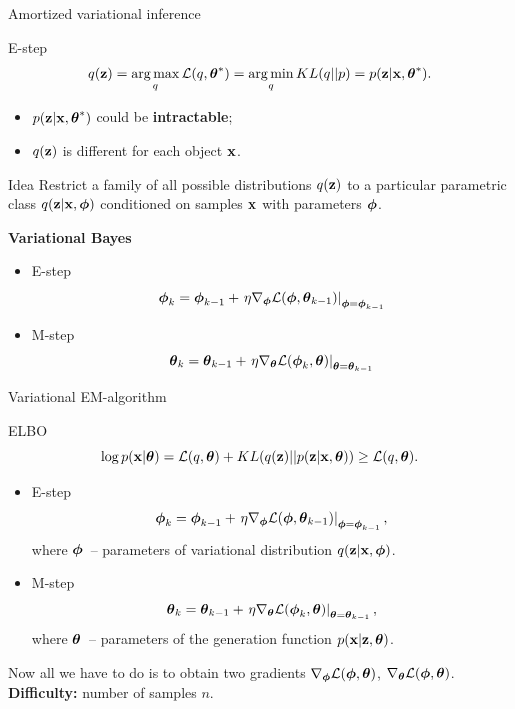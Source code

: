 \begin{frame}{Amortized variational inference}
    \begin{block}{E-step}
    \vspace{-0.3cm}
    \[
		q(\mathbf{z}) = \operatorname*{arg\,max}_q \mathcal{L} (q, \boldsymbol{\theta}^*) = \operatorname*{arg\,min}_q KL(q || p) =
		 p(\mathbf{z}| \mathbf{x}, \boldsymbol{\theta}^*).
	\]
	\begin{itemize}
		\item $p(\mathbf{z}| \mathbf{x}, \boldsymbol{\theta}^*)$ could be \textbf{intractable};
		\item $q(\mathbf{z})$ is different for each object $\mathbf{x}$.
	\end{itemize}
    \end{block}
	\begin{block}{Idea}
	Restrict a family of all possible distributions $q(\mathbf{z})$ to a particular parametric class $q(\mathbf{z}|\mathbf{x}, \boldsymbol{\phi})$ conditioned on samples $\mathbf{x}$ with parameters $\boldsymbol{\phi}$.
	\end{block}
	
	\textbf{Variational Bayes}
	\begin{itemize}
		\item E-step
		\[
		\boldsymbol{\phi}_k = \boldsymbol{\phi}_{k-1} + \left.\eta \nabla_{\boldsymbol{\phi}} \mathcal{L}(\boldsymbol{\phi}, \boldsymbol{\theta}_{k-1})\right|_{\boldsymbol{\phi}=\boldsymbol{\phi}_{k-1}}
		\]
		\item M-step
		\[
		\boldsymbol{\theta}_k = \boldsymbol{\theta}_{k-1} + \left.\eta \nabla_{\boldsymbol{\theta}} \mathcal{L}(\boldsymbol{\phi}_k, \boldsymbol{\theta})\right|_{\boldsymbol{\theta}=\boldsymbol{\theta}_{k-1}}
		\]
	\end{itemize}
\end{frame}
\begin{frame}{Variational EM-algorithm}

	\begin{block}{ELBO}
		\vspace{-0.1cm}
		\[
		\log p(\mathbf{x}| \boldsymbol{\theta}) = \mathcal{L} (q, \boldsymbol{\theta}) + KL(q(\mathbf{z}) || p(\mathbf{z}|\mathbf{x}, \boldsymbol{\theta})) \geq \mathcal{L} (q, \boldsymbol{\theta}).
		\]
	\end{block}
	\begin{itemize}
		\item E-step
		\[
		\boldsymbol{\phi}_k = \boldsymbol{\phi}_{k-1} + \left.\eta \nabla_{\boldsymbol{\phi}} \mathcal{L}(\boldsymbol{\phi}, \boldsymbol{\theta}_{k-1})\right|_{\boldsymbol{\phi}=\boldsymbol{\phi}_{k-1}},
		\]
		where $\boldsymbol{\phi}$~-- parameters of variational distribution $q(\mathbf{z} | \mathbf{x}, \boldsymbol{\phi})$.
		\item M-step
		\[
		\boldsymbol{\theta}_k = \boldsymbol{\theta}_{k-1} + \left.\eta \nabla_{\boldsymbol{\theta}} \mathcal{L}(\boldsymbol{\phi}_k, \boldsymbol{\theta})\right|_{\boldsymbol{\theta}=\boldsymbol{\theta}_{k-1}},
		\]
		where $\boldsymbol{\theta}$~-- parameters of the generation function $p(\mathbf{x} | \mathbf{z}, \boldsymbol{\theta})$.
	\end{itemize}
	Now all we have to do is to obtain two gradients $\nabla_{\boldsymbol{\phi}} \mathcal{L}(\boldsymbol{\phi}, \boldsymbol{\theta})$, $\nabla_{\boldsymbol{\theta}} \mathcal{L}(\boldsymbol{\phi}, \boldsymbol{\theta})$.  \\
	\textbf{Difficulty:} number of samples $n$.
\end{frame}
